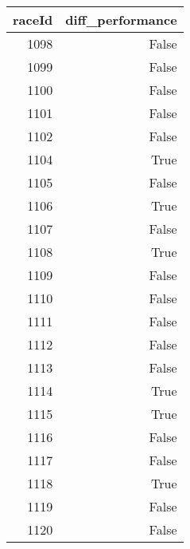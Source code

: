 \begin{tabular}{rr}
\toprule
raceId & diff_performance \\
\midrule
1098 & False \\
1099 & False \\
1100 & False \\
1101 & False \\
1102 & False \\
1104 & True \\
1105 & False \\
1106 & True \\
1107 & False \\
1108 & True \\
1109 & False \\
1110 & False \\
1111 & False \\
1112 & False \\
1113 & False \\
1114 & True \\
1115 & True \\
1116 & False \\
1117 & False \\
1118 & True \\
1119 & False \\
1120 & False \\
\bottomrule
\end{tabular}
